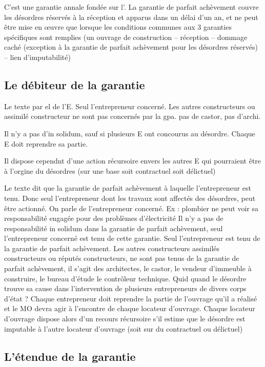 	C’est une garantie annale fondée sur l’. La garantie de parfait achèvement couvre les désordres réservés à la réception et apparus dans un délai d’un an, et ne peut être mise en œuvre que lorsque les conditions communes aux 3 garanties spécifiques sont remplies (un ouvrage de construction – réception – dommage caché (exception à la garantie de parfait achèvement pour les désordres réservés) – lien d’imputabilité)

		\subsection{Le débiteur de la garantie}

		Le texte par el de l'E. Seul l'entrepreneur concerné. Les autres constructeurs ou assimilé constructeur ne sont pas concernés par la gpa. pas de castor, pas d'archi.

		Il n'y a pas d'in solidum, sauf si plusieurs E ont concourus au désordre. Chaque E doit reprendre sa partie.

		Il dispose cependnt d'une action récursoire envers les autres E qui pourraient être à l'orgine du désordres (sur une base soit contractuel soit délictuel)

		Le texte dit que la garantie de parfait achèvement à laquelle l’entrepreneur est tenu. Donc seul l’entrepreneur dont les travaux sont affectés des désordres, peut être actionné. On parle de l’entrepreneur concerné.
		Ex : plombier ne peut voir sa responsabilité engagée pour des problèmes d’électricité
		Il n’y a pas de responsabilité in solidum dans la garantie de parfait achèvement, seul l’entrepreneur concerné est tenu de cette garantie.
		Seul l’entrepreneur est tenu de la garantie de parfait achèvement.
		Les autres constructeurs assimilés constructeurs ou réputés constructeurs, ne sont pas tenus de la garantie de parfait achèvement, il s’agit des architectes, le castor, le vendeur d’immeuble à construire, le bureau d’étude le contrôleur technique.
		Quid quand le désordre trouve sa cause dans l’intervention de plusieurs entrepreneurs de divers corps d’état ?
		Chaque entrepreneur doit reprendre la partie de l’ouvrage qu’il a réalisé et le MO devra agir à l’encontre de chaque locateur d’ouvrage.
		Chaque locateur d’ouvrage dispose alors d’un recours récursoire s’il estime que le désordre est imputable à l’autre locateur d’ouvrage (soit sur du contractuel ou délictuel)

		\subsection{L'étendue de la garantie}


